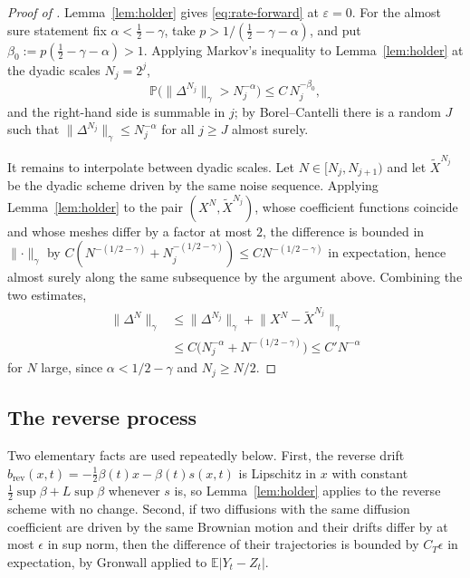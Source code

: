\documentclass[a4paper,fleqn]{cas-dc}
\theoremstyle{definition}
\newcommand{\E}{\mathbb{E}}
\newcommand{\PP}{\mathbb{P}}
\begin{document}
\begin{proof}[Proof of ]
Lemma~\ref{lem:holder} gives \eqref{eq:rate-forward} at $\varepsilon=0$. For the almost sure statement fix $\alpha<\tfrac12-\gamma$, take
$p>1/(\tfrac12-\gamma-\alpha)$, and put $\beta_{0}:=p(\tfrac12-\gamma-\alpha)>1$.
Applying Markov's inequality to Lemma~\ref{lem:holder} at the dyadic scales $N_{j}=2^{j}$,
\[
\PP\bigl(\lVert\Delta^{N_{j}}\rVert_{\gamma}>N_{j}^{-\alpha}\bigr)\le C\,N_{j}^{-\beta_{0}},
\]
and the right-hand side is summable in $j$; by Borel--Cantelli there is a random
$J$ such that $\lVert\Delta^{N_{j}}\rVert_{\gamma}\le N_{j}^{-\alpha}$ for all
$j\ge J$ almost surely.

It remains to interpolate between dyadic scales. Let $N\in[N_{j},N_{j+1})$ and let
$\tilde X^{N_{j}}$ be the dyadic scheme driven by the same noise sequence. Applying
Lemma~\ref{lem:holder} to the pair $(X^{N},\tilde X^{N_{j}})$, whose coefficient functions
coincide and whose meshes differ by a factor at most $2$, the difference is bounded in
$\lVert\cdot\rVert_{\gamma}$ by $C(N^{-(1/2-\gamma)}+N_{j}^{-(1/2-\gamma)})\le
CN^{-(1/2-\gamma)}$ in expectation, hence almost surely along the same subsequence by
the argument above. Combining the two estimates,
\[
\begin{aligned}
\lVert\Delta^{N}\rVert_{\gamma}
&\le\lVert\Delta^{N_{j}}\rVert_{\gamma}
+\lVert X^{N}-\tilde X^{N_{j}}\rVert_{\gamma}\\
&\le C\bigl(N_{j}^{-\alpha}+N^{-(1/2-\gamma)}\bigr)
\le C' N^{-\alpha}
\end{aligned}
\]
for $N$ large, since $\alpha<1/2-\gamma$ and $N_{j}\ge N/2$.
\end{proof}

\subsection{The reverse process}

Two elementary facts are used repeatedly below. First, the reverse drift
$b_{\mathrm{rev}}(x,t)=-\tfrac12\beta(t)x-\beta(t)s(x,t)$ is Lipschitz in $x$ with
constant $\tfrac12\sup\beta+L\sup\beta$ whenever $s$ is, so Lemma~\ref{lem:holder} applies
to the reverse scheme with no change. Second, if two diffusions with the same diffusion
coefficient are driven by the same Brownian motion and their drifts differ by at most
$\epsilon$ in sup norm, then the difference of their trajectories is bounded by
$C_{T}\epsilon$ in expectation, by Gronwall applied to
$\E\lvert Y_{t}-Z_{t}\rvert$.
\end{document}
